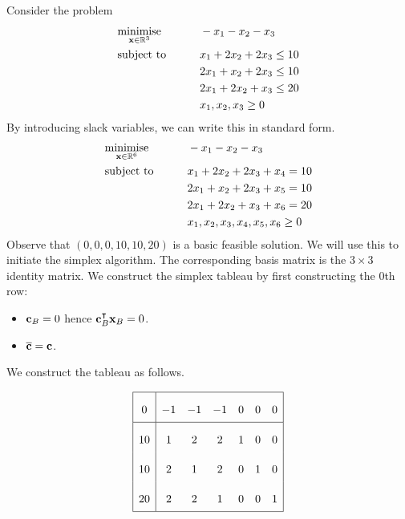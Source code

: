 \begin{example}
	Consider the problem
	\begin{alignat*}{2}
		 & \underset{\vb x \in \mathbb R^3}{\text{minimise}} & \qquad & -x_1-x_2-x_3              \\
		 & \text{subject to}                                 &        & x_1 + 2x_2 + 2x_3 \leq 10 \\
		 &                                                   &        & 2x_1 + x_2 + 2x_3 \leq 10 \\
		 &                                                   &        & 2x_1 + 2x_2 + x_3 \leq 20 \\
		 &                                                   &        & x_1,x_2,x_3 \geq 0        \\
	\end{alignat*}
	By introducing slack variables, we can write this in standard form.
	\begin{alignat*}{2}
		 & \underset{\vb x \in \mathbb R^6}{\text{minimise}} & \qquad & -x_1-x_2-x_3                   \\
		 & \text{subject to}                                 &        & x_1 + 2x_2 + 2x_3 + x_4 = 10   \\
		 &                                                   &        & 2x_1 + x_2 + 2x_3 + x_5 = 10   \\
		 &                                                   &        & 2x_1 + 2x_2 + x_3 + x_6 = 20   \\
		 &                                                   &        & x_1,x_2,x_3,x_4,x_5,x_6 \geq 0 \\
	\end{alignat*}
	Observe that \((0,0,0,10,10,20)\) is a basic feasible solution.
	We will use this to initiate the simplex algorithm.
	The corresponding basis matrix is the \(3\times 3\) identity matrix.
	We construct the simplex tableau by first constructing the 0th row:
	\begin{itemize}
		\item \( \vb c_B = 0 \) hence \( \vb c_B^\intercal \vb x_B = 0 \).
		\item \( \overline{\vb c} = \vb c \).
	\end{itemize}
	We construct the tableau as follows.

	\[
		\arraycolsep=5pt\def\arraystretch{2.2}
		\begin{array}{|c|cccccc|}\hline
			0  & -1 & -1 & -1 & 0 & 0 & 0 \\\hline
			10 & 1  & 2  & 2  & 1 & 0 & 0 \\
			10 & 2  & 1  & 2  & 0 & 1 & 0 \\
			20 & 2  & 2  & 1  & 0 & 0 & 1 \\\hline
		\end{array}
	\]


\end{example}
